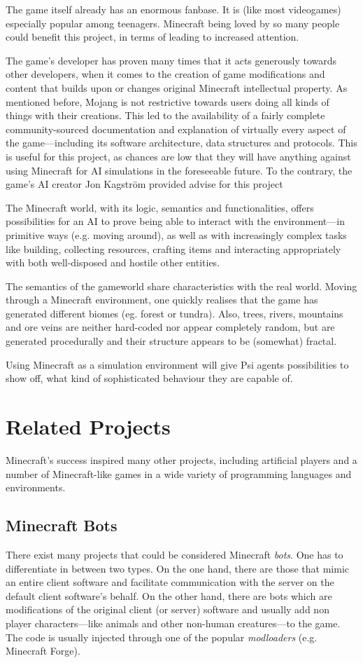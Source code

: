 The game itself already has an enormous fanbase. It is (like most videogames) especially popular among teenagers. Minecraft being loved by so many people could benefit this project, in terms of leading to increased attention.

The game's developer has proven many times that it acts generously towards  other developers, when it comes to the creation of game modifications and content that builds upon or changes original Minecraft intellectual property. As mentioned before, Mojang is not restrictive towards users doing all kinds of things with their creations. This led to the availability of a fairly complete community-sourced  documentation and explanation of virtually every aspect of the game---including its software architecture, data structures and protocols. This is useful for this project, as chances are low that they will have anything against using Minecraft for AI simulations in the foreseeable future. To the contrary, the game's AI creator Jon Kagström provided advise for this project

The Minecraft world, with its logic, semantics and functionalities, offers possibilities for an AI to prove being able to interact with the environment---in primitive ways (e.g. moving around), as well as with increasingly complex tasks like building, collecting resources, crafting items and interacting appropriately with both well-disposed and hostile other entities.

The semantics of the gameworld share characteristics with the real world. Moving through a Minecraft environment, one quickly realises that the game has generated different biomes (eg. forest or tundra). Also, trees, rivers, mountains and ore veins are neither hard-coded nor appear completely random, but are generated procedurally and their structure appears to be (somewhat) fractal.
        
Using Minecraft as a simulation environment will give Psi agents possibilities to show off, what kind of sophisticated behaviour they are capable of.

    \section{Related Projects}
    \label{sec:3:relatedprojects}
Minecraft's success inspired many other projects, including artificial players and a number of Minecraft-like games in a wide variety of programming languages and environments.


        \subsection{Minecraft Bots}
There exist many projects that could be considered Minecraft \emph{bots}. One has to differentiate in between two types. On the one hand, there are those that mimic an entire client software and facilitate communication with the server on the default client software's behalf. On the other hand, there are bots which are modifications of the original client (or server) software and usually add non player characters---like animals and other non-human creatures---to the game. The code is usually injected through one of the popular \emph{modloaders} (e.g. Minecraft Forge).

